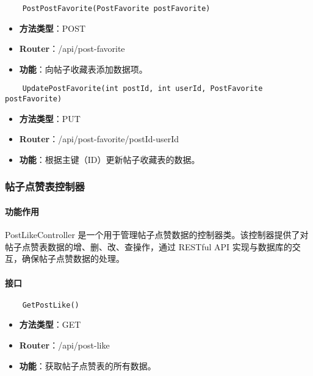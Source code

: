 \begin{verbatim}
	PostPostFavorite(PostFavorite postFavorite)
\end{verbatim}

\begin{itemize}
	\item \textbf{方法类型}：POST
	\item \textbf{Router}：/api/post-favorite
	\item \textbf{功能}：向帖子收藏表添加数据项。
\end{itemize}

\begin{verbatim}
	UpdatePostFavorite(int postId, int userId, PostFavorite postFavorite)
\end{verbatim}

\begin{itemize}
	\item \textbf{方法类型}：PUT
	\item \textbf{Router}：/api/post-favorite/{postId}-{userId}
	\item \textbf{功能}：根据主键（ID）更新帖子收藏表的数据。
\end{itemize}

\subsubsection{帖子点赞表控制器}

\paragraph{功能作用}

PostLikeController 是一个用于管理帖子点赞数据的控制器类。该控制器提供了对帖子点赞表数据的增、删、改、查操作，通过 RESTful API 实现与数据库的交互，确保帖子点赞数据的处理。

\paragraph{接口}

\begin{verbatim}
	GetPostLike()
\end{verbatim}

\begin{itemize}
	\item \textbf{方法类型}：GET
	\item \textbf{Router}：/api/post-like
	\item \textbf{功能}：获取帖子点赞表的所有数据。
\end{itemize}

